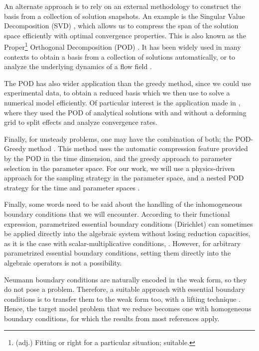 An alternate approach is to rely on an external methodology
to construct the basis from a collection of solution snapshots.
An example is
the Singular Value Decomposition (SVD)
\cite{2000_POD_as_SVD},
which allows us to compress the span of the solution space
efficiently with optimal convergence properties.
This is also known as the Proper\footnote
{
    (adj.) Fitting or right for a particular situation; suitable.
} Orthogonal Decomposition (POD)
\cite{Aubry1991}.
It has been widely used in many contexts 
to obtain a basis from a collection of solutions automatically,
or to analyze the underlying dynamics of a flow field 
\cite{1987_turbulenceDynamicsCoherentStructures_Sirovich}.

The POD has also wider application than the greedy method,
since we could use experimental data, 
to obtain a reduced basis which we then use to solve a numerical model efficiently.
Of particular interest is the application made in
\cite{2003_podBasedReducedOrderModelsWithDeformingGrids_anttonen},
where they used the POD of analytical solutions 
with and without a deforming grid to split effects and analyze convergence rates.

Finally, for unsteady problems, one may have the combination of both;
the \mbox{POD-Greedy} method
\cite{Haasdonk2008, 
Haasdonk2013}.
This method uses the automatic compression feature provided by the POD in the time dimension,
and the greedy approach to parameter selection in the parameter space.
For our work, we will use a physics-driven approach for the sampling strategy in the parameter space,
and a nested POD strategy for the time and parameter spaces \cite{Santo_Manzoni_2019}.

Finally, some words need to be said about the handling of 
the inhomogeneous boundary conditions that we will encounter.
According to their functional expression, 
parametrized essential boundary conditions (Dirichlet) 
can sometimes be applied directly into the algebraic system
without losing reduction capacities,
as it is the case with scalar-multiplicative conditions,
\cite{separableBoundaryCondition,
separableBoundaryCondition_Two}.
However, for arbitrary parametrized essential boundary conditions,
setting them directly into the algebraic operators is not a possibility.

Neumann boundary conditions are naturally encoded in the weak form,
so they do not pose a problem.
Therefore, a suitable approach with essential boundary conditions
is to transfer them to the weak form too,
with a lifting technique
\cite{2007_ReducedOrderModelingTimeDependentPDEsMultipleParametersBoundaryData_gunzburger}.
Hence, the target model problem that we reduce 
becomes one with homogeneous boundary conditions,
for which the results from most references apply.

